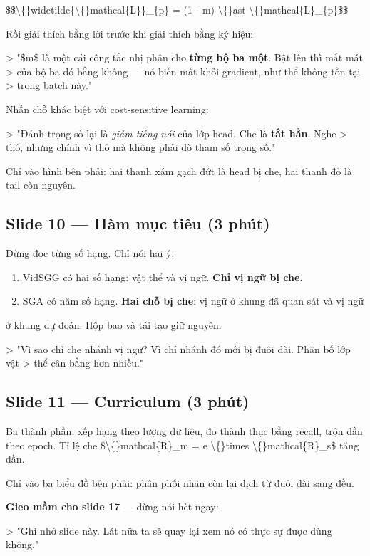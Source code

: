 \documentclass[11pt,a4paper]{article}
\begin{document}
\$\$\textbackslash\{\}widetilde\{\textbackslash\{\}mathcal\{L\}\}\_\{p\} = (1 - m) \textbackslash\{\}ast \textbackslash\{\}mathcal\{L\}\_\{p\}\$\$

Rồi giải thích bằng lời trước khi giải thích bằng ký hiệu:

> "\$m\$ là một cái công tắc nhị phân cho \textbf{từng bộ ba một}. Bật lên thì mất mát > của bộ ba đó bằng không --- nó biến mất khỏi gradient, như thể không tồn tại > trong batch này."

Nhấn chỗ khác biệt với cost-sensitive learning:

> "Đánh trọng số lại là \emph{giảm tiếng nói} của lớp head. Che là \textbf{tắt hẳn}. Nghe > thô, nhưng chính vì thô mà không phải dò tham số trọng số."

Chỉ vào hình bên phải: hai thanh xám gạch đứt là head bị che, hai thanh đỏ là tail còn nguyên.

\subsection{Slide 10 --- Hàm mục tiêu (3 phút)}
Đừng đọc từng số hạng. Chỉ nói hai ý:

\begin{enumerate}\itemsep2pt
\item VidSGG có hai số hạng: vật thể và vị ngữ. \textbf{Chỉ vị ngữ bị che.}
\item SGA có năm số hạng. \textbf{Hai chỗ bị che}: vị ngữ ở khung đã quan sát và vị ngữ
\end{enumerate}
ở khung dự đoán. Hộp bao và tái tạo giữ nguyên.

> "Vì sao chỉ che nhánh vị ngữ? Vì chỉ nhánh đó mới bị đuôi dài. Phân bố lớp vật > thể cân bằng hơn nhiều."

\subsection{Slide 11 --- Curriculum (3 phút)}
Ba thành phần: xếp hạng theo lượng dữ liệu, đo thành thục bằng recall, trộn dần theo epoch. Tỉ lệ che \$\textbackslash\{\}mathcal\{R\}\_m = e \textbackslash\{\}times \textbackslash\{\}mathcal\{R\}\_s\$ tăng dần.

Chỉ vào ba biểu đồ bên phải: phân phối nhãn còn lại dịch từ đuôi dài sang đều.

\textbf{Gieo mầm cho slide 17} --- đừng nói hết ngay:

> "Ghi nhớ slide này. Lát nữa ta sẽ quay lại xem nó có thực sự được dùng không."
\end{document}
